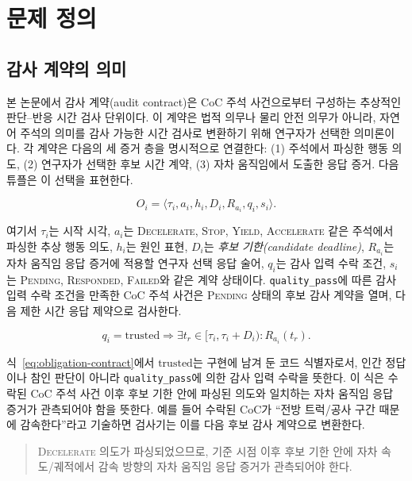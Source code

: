 \section{문제 정의}
\label{sec:problem}

\subsection{감사 계약의 의미}
본 논문에서 감사 계약(audit contract)은 CoC 주석 사건으로부터 구성하는 추상적인 판단--반응 시간 검사 단위이다. 이 계약은 법적 의무나 물리 안전 의무가 아니라, 자연어 주석의 의미를 감사 가능한 시간 검사로 변환하기 위해 연구자가 선택한 의미론이다. 각 계약은 다음의 세 증거 층을 명시적으로 연결한다: (1) 주석에서 파싱한 행동 의도, (2) 연구자가 선택한 후보 시간 계약, (3) 자차 움직임에서 도출한 응답 증거. 다음 튜플은 이 선택을 표현한다.

\begin{equation}
O_i = \langle \tau_i, a_i, h_i, D_i, R_{a_i}, q_i, s_i \rangle .
\end{equation}

여기서 $\tau_i$는 시작 시각, $a_i$는 \textsc{Decelerate}, \textsc{Stop}, \textsc{Yield}, \textsc{Accelerate} 같은 주석에서 파싱한 추상 행동 의도, $h_i$는 원인 표현, $D_i$는 \emph{후보 기한(candidate deadline)}, $R_{a_i}$는 자차 움직임 응답 증거에 적용할 연구자 선택 응답 술어, $q_i$는 감사 입력 수락 조건, $s_i$는 \textsc{Pending}, \textsc{Responded}, \textsc{Failed}와 같은 계약 상태이다. \texttt{quality\_pass}에 따른 감사 입력 수락 조건을 만족한 CoC 주석 사건은 \textsc{Pending} 상태의 후보 감사 계약을 열며, 다음 제한 시간 응답 제약으로 검사한다.

\begin{equation}
q_i=\mathrm{trusted}
\Rightarrow
\exists t_r \in [\tau_i,\tau_i + D_i) :
R_{a_i}(t_r).
\label{eq:obligation-contract}
\end{equation}

식~\eqref{eq:obligation-contract}에서 \(\mathrm{trusted}\)는 구현에 남겨 둔 코드 식별자로서, 인간 정답이나 참인 판단이 아니라 \texttt{quality\_pass}에 의한 감사 입력 수락을 뜻한다. 이 식은 수락된 CoC 주석 사건 이후 후보 기한 안에 파싱된 의도와 일치하는 자차 움직임 응답 증거가 관측되어야 함을 뜻한다. 예를 들어 수락된 CoC가 ``전방 트럭/공사 구간 때문에 감속한다''라고 기술하면 검사기는 이를 다음 후보 감사 계약으로 변환한다.

\begin{quote}
\small
\textsc{Decelerate} 의도가 파싱되었으므로, 기준 시점 이후 후보 기한 안에 자차 속도/궤적에서 감속 방향의 자차 움직임 응답 증거가 관측되어야 한다.
\end{quote}

